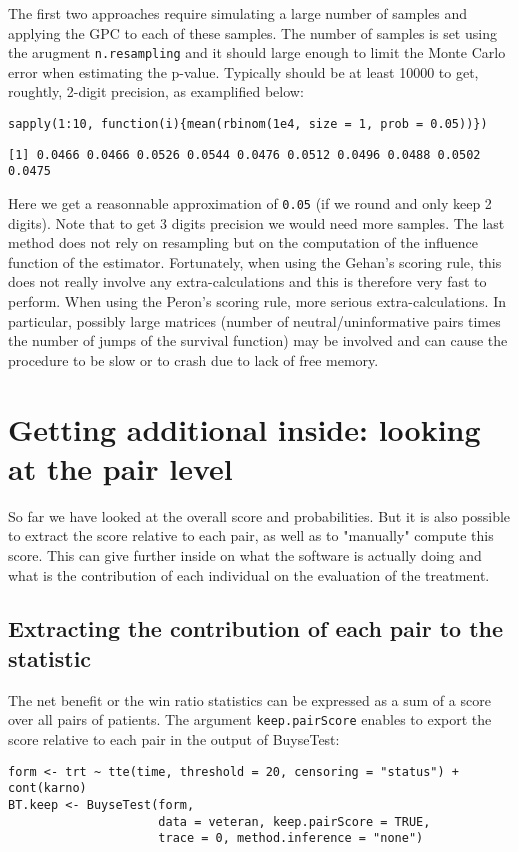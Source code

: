\documentclass[12pt]{article}
\begin{document}
The first two approaches require simulating a large number of samples
and applying the GPC to each of these samples. The number of samples
is set using the arugment \texttt{n.resampling} and it should large enough to
limit the Monte Carlo error when estimating the p-value. Typically
should be at least 10000 to get, roughtly, 2-digit precision, as
examplified below:
\lstset{language=r,label= ,caption= ,captionpos=b,numbers=none}
\begin{lstlisting}
sapply(1:10, function(i){mean(rbinom(1e4, size = 1, prob = 0.05))})
\end{lstlisting}

\begin{verbatim}
[1] 0.0466 0.0466 0.0526 0.0544 0.0476 0.0512 0.0496 0.0488 0.0502 0.0475
\end{verbatim}
Here we get a reasonnable approximation of \texttt{0.05} (if we round and
only keep 2 digits). Note that to get 3 digits precision we would need
more samples. The last method does not rely on resampling but on the
computation of the influence function of the estimator. Fortunately,
when using the Gehan's scoring rule, this does not really involve any
extra-calculations and this is therefore very fast to perform. When
using the Peron's scoring rule, more serious extra-calculations. In
particular, possibly large matrices (number of neutral/uninformative
pairs times the number of jumps of the survival function) may be
involved and can cause the procedure to be slow or to crash due to
lack of free memory.

\clearpage

\section{Getting additional inside: looking at the pair level}
\label{sec:orga511f0d}

So far we have looked at the overall score and probabilities. But it
is also possible to extract the score relative to each pair, as well
as to "manually" compute this score. This can give further inside on
what the software is actually doing and what is the contribution of
each individual on the evaluation of the treatment.

\subsection{Extracting the contribution of each pair to the statistic}
\label{sec:org6e533d9}
The net benefit or the win ratio statistics can be expressed as a sum
of a score over all pairs of patients. The argument \texttt{keep.pairScore}
enables to export the score relative to each pair in the output of
BuyseTest:
\lstset{language=r,label= ,caption= ,captionpos=b,numbers=none}
\begin{lstlisting}
form <- trt ~ tte(time, threshold = 20, censoring = "status") + cont(karno)
BT.keep <- BuyseTest(form,
					 data = veteran, keep.pairScore = TRUE, 
					 trace = 0, method.inference = "none")
\end{lstlisting}
\end{document}
